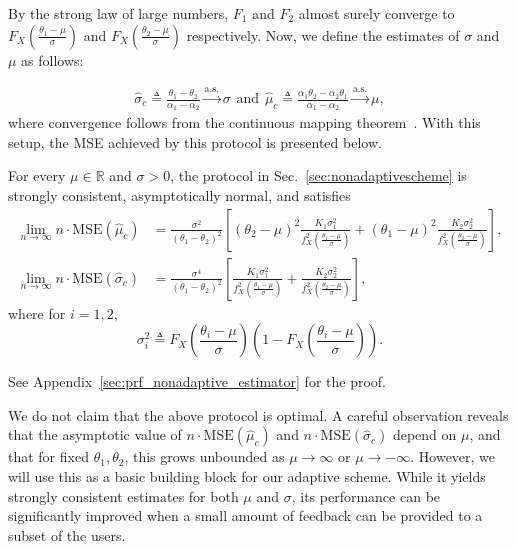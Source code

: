 \documentclass[10pt]{article} %
\theoremstyle{plain}
\theoremstyle{definition}
\theoremstyle{remark}
\newcommand{\bR}{\mathbb R}
\newcommand{\as}{\text{a.s.}}
\newcommand{\mse}{\mathrm{MSE}}
\begin{document}
By the strong law of large numbers, \( F_1 \) and \( F_2 \) almost surely converge to \( F_{X} \left(\frac{\theta_1 - \mu }{\sigma} \right) \) and \( F_{X} \left(\frac{\theta_2 - \mu }{\sigma} \right) \) respectively. Now, we define the estimates of \( \sigma \) and \( \mu\) as follows:

\begin{align}\label{eq:mu_sigma_converg} 
\hat{\sigma}_c \triangleq \frac{\theta_1 -\theta_2}{ \alpha_1 - \alpha_2} \xrightarrow{\as} \sigma \hspace{5pt} \text{and} \hspace{5pt} 
\hat{\mu}_c \triangleq \frac{\alpha_1\theta_2 - \alpha_2 \theta_1}{ \alpha_1 - \alpha_2} \xrightarrow{\as} \mu, 
\end{align}
where convergence follows from the continuous mapping theorem~\cite[Sec.\ 5.5]{casella2002statistical}. With this setup, the MSE achieved by this protocol is presented below.

\begin{theorem}\label{thm:mean_varinace_estimation}
For every $\mu \in \bR$ and $\sigma>0$, the protocol in Sec.~\ref{sec:nonadaptivescheme} is strongly consistent, asymptotically normal, and satisfies
\begin{align*}
\lim_{n \to \infty} n \cdot \mse(\hat{\mu}_c) &=
\frac{\sigma^2}{(\theta_1 - \theta_2)^2} \left[ (\theta_2 - \mu)^2 \frac{K_1\sigma_1^2}{f_X^2 \left(\frac{\theta_1 - \mu}{\sigma}\right)}
+ (\theta_1 - \mu)^2 \frac{K_2\sigma_2^2}{f_X^2 \left(\frac{\theta_2 - \mu}{\sigma}\right)} \right], \\
\lim_{n \to \infty} n \cdot \mse(\hat{\sigma}_c) &=
\frac{\sigma^4}{(\theta_1 - \theta_2)^2} \left[ \frac{K_1\sigma_1^2}{f_X^2 \left(\frac{\theta_1 - \mu}{\sigma}\right)}
+ \frac{K_2\sigma_2^2}{f_X^2 \left(\frac{\theta_2 - \mu}{\sigma}\right)} \right],
\end{align*}
where for $i=1,2$,
\[
\sigma_i^2 \triangleq F_X \left(\frac{\theta_i - \mu}{\sigma}\right) \left(1 - F_X \left(\frac{\theta_i - \mu}{\sigma}\right)\right).
\]
\end{theorem}
See Appendix~\ref{sec:prf_nonadaptive_estimator} for the proof.

We do not claim that the above protocol is optimal. 
A careful observation reveals that the asymptotic value of $n\cdot\mse(\hat{\mu}_c)$ and $n\cdot\mse(\hat{\sigma}_c)$ depend on $\mu$, and that for fixed $\theta_1,\theta_2$, this grows unbounded as $\mu\to\infty$ or $\mu\to -\infty$.
However, we will use this as a basic building block for our adaptive scheme. While it yields strongly consistent estimates for both $\mu$ and $\sigma$, its performance can be significantly improved when a small amount of feedback can be provided to a subset of the users.  
\end{document}
